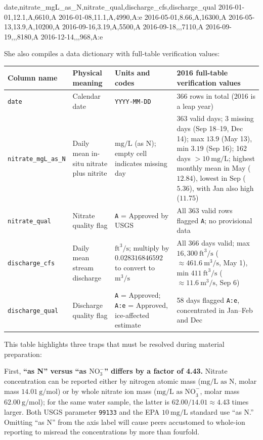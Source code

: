 \begin{Prompt}
date,nitrate_mgL_as_N,nitrate_qual,discharge_cfs,discharge_qual
2016-01-01,12.1,A,6610,A
2016-01-08,11.1,A,4990,A:e
2016-05-01,8.66,A,16300,A
2016-05-13,13.9,A,10200,A
2016-09-16,3.19,A,5500,A
2016-09-18,,,7110,A
2016-09-19,,,8180,A
2016-12-14,,,968,A:e
\end{Prompt}

She also compiles a data dictionary with full-table verification values:

\begin{center}\footnotesize
\setlength{\tabcolsep}{3pt}
\renewcommand{\arraystretch}{1.15}
\begin{tabularx}{\linewidth}{@{}l>{\raggedright\arraybackslash}p{25mm}>{\raggedright\arraybackslash}p{27mm}Y@{}}
\toprule
\textbf{Column name} & \textbf{Physical meaning} & \textbf{Units and codes} & \textbf{2016 full-table verification values} \\
\midrule
\texttt{date} & Calendar date & \texttt{YYYY-MM-DD} & 366 rows in total (2016 is a leap year) \\
\texttt{nitrate\_mgL\_as\_N} & Daily mean in-situ nitrate plus nitrite & $\text{mg/L}$ (as N); empty cell indicates missing day & 363 valid days; 3 missing days (Sep 18--19, Dec 14); max $13.9$ (May 13), min $3.19$ (Sep 16); 162 days $>10\ \text{mg/L}$; highest monthly mean in May ($12.84$), lowest in Sep ($5.36$), with Jan also high ($11.75$) \\
\texttt{nitrate\_qual} & Nitrate quality flag & \texttt{A} = Approved by USGS & All 363 valid rows flagged \texttt{A}; no provisional data \\
\texttt{discharge\_cfs} & Daily mean stream discharge & $\text{ft}^3/\text{s}$; multiply by $0.028316846592$ to convert to $\text{m}^3/\text{s}$ & All 366 days valid; max $16,300\ \text{ft}^3/\text{s}$ ($\approx 461.6\ \text{m}^3/\text{s}$, May 1), min $411\ \text{ft}^3/\text{s}$ ($\approx 11.6\ \text{m}^3/\text{s}$, Sep 6) \\
\texttt{discharge\_qual} & Discharge quality flag & \texttt{A} = Approved; \texttt{A:e} = Approved, ice-affected estimate & 58 days flagged \texttt{A:e}, concentrated in Jan--Feb and Dec \\
\bottomrule
\end{tabularx}
\end{center}

This table highlights three traps that must be resolved during material preparation:

First, \textbf{``as N'' versus ``as $\text{NO}_3^-$'' differs by a factor of 4.43.} Nitrate concentration can be reported either by nitrogen atomic mass ($\text{mg/L as N}$, molar mass $14.01\ \text{g/mol}$) or by whole nitrate ion mass ($\text{mg/L as NO}_3^-$, molar mass $62.00\ \text{g/mol}$); for the same water sample, the latter is $62.00 / 14.01 \approx 4.43$ times larger. Both USGS parameter \texttt{99133} and the EPA $10\ \text{mg/L}$ standard use ``as N.'' Omitting ``as N'' from the axis label will cause peers accustomed to whole-ion reporting to misread the concentrations by more than fourfold.

